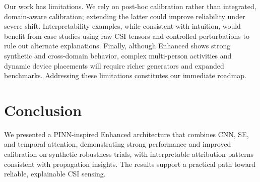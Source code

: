 \documentclass[journal]{IEEEtran}
\begin{document}
Our work has limitations. We rely on post-hoc calibration rather than integrated, domain-aware calibration; extending the latter could improve reliability under severe shift. Interpretability examples, while consistent with intuition, would benefit from case studies using raw CSI tensors and controlled perturbations to rule out alternate explanations. Finally, although Enhanced shows strong synthetic and cross-domain behavior, complex multi-person activities and dynamic device placements will require richer generators and expanded benchmarks. Addressing these limitations constitutes our immediate roadmap.

\section{Conclusion}
We presented a PINN-inspired Enhanced architecture that combines CNN, SE, and temporal attention, demonstrating strong performance and improved calibration on synthetic robustness trials, with interpretable attribution patterns consistent with propagation insights. The results support a practical path toward reliable, explainable CSI sensing.



\end{document}
